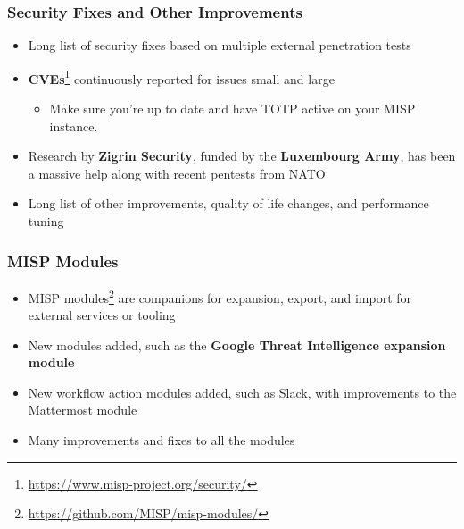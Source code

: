 \begin{frame}
  \frametitle{Security Fixes and Other Improvements}
  \begin{itemize}
     \item Long list of security fixes based on multiple external penetration tests
     \item \textbf{CVEs}\footnote{\url{https://www.misp-project.org/security/}} continuously reported for issues small and large
     \begin{itemize}
         \item Make sure you're up to date and have TOTP active on your MISP instance.
     \end{itemize}
     \item Research by \textbf{Zigrin Security}, funded by the \textbf{Luxembourg Army}, has been a massive help along with recent pentests from NATO
     \item Long list of other improvements, quality of life changes, and performance tuning
  \end{itemize}
\end{frame}


\begin{frame}
\frametitle{MISP Modules}
    \begin{itemize}
        \item MISP modules\footnote{\url{https://github.com/MISP/misp-modules/}} are companions for expansion, export, and import for external services or tooling
	\item New modules added, such as the {\bf Google Threat Intelligence expansion module}
        \item New workflow action modules added, such as Slack, with improvements to the Mattermost module
        \item Many improvements and fixes to all the modules
    \end{itemize}
\end{frame}

